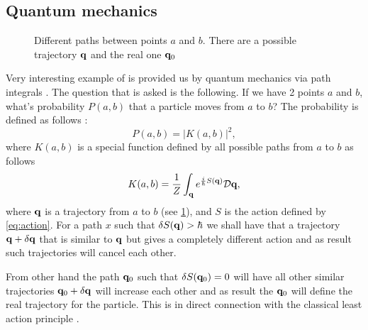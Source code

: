 \subsection{Quantum mechanics}

\begin{figure}
  \centering
  \caption{Different paths between points $a$ and $b$. There are a possible
    trajectory ${\bf q}$ and the real one ${\bf q}_0$}
  \label{fig:pathintegral}
\end{figure}


Very interesting example of  is provided us by
quantum mechanics via path integrals \cite{feynman2010quantum}. The
question that is asked is the following. If we have 2 points $a$ and
$b$, what's probability $P(a, b)$ that a particle moves from $a$ to
$b$? The probability is defined as follows \cite{feynman2010quantum}:
\[
P(a,b) = \left|K(a,b)\right|^2,
\]
where $K(a,b)$ is a special function defined by all possible paths
from $a$ to $b$ as follows
\[
K(a,b) = \frac{1}{Z} \int_{\bf q} e^{\frac{i}{\hbar}S({\bf q})} \mathcal{D}{\bf q},
\]
where ${\bf q}$ is a trajectory from $a$ to $b$ (see
\cref{fig:pathintegral}), and $S$ is the action 
defined by \eqref{eq:action}. For a path $x$ such that $\delta S({\bf q}) >
\hbar$ we shall have that a trajectory ${\bf q} + \delta {\bf q}$ that is similar
to ${\bf q}$ but gives a completely different action and as result such
trajectories will cancel each other.   

From other hand the path ${\bf q}_0$ such that
$\delta S({\bf q}_0) = 0$ will have all other similar trajectories ${\bf q}_0 +
\delta {\bf q}$ will increase each other and as result the ${\bf q}_0$ will define
the real trajectory for the particle. This is in direct connection
with the classical least action principle
\cite{wiki:least_action_principle}.  
